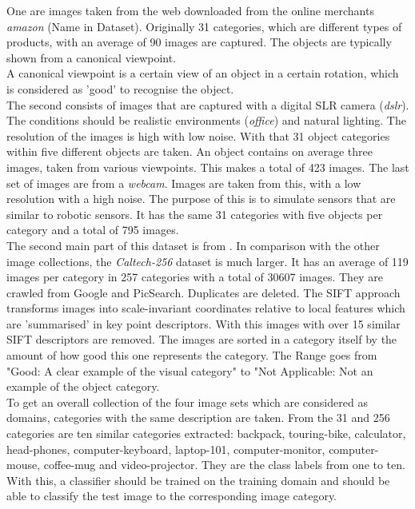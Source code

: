 One are images taken from the web downloaded from the online merchants \textit{amazon} (Name in Dataset).
Originally 31 categories, which are different types of products, with an average of 90 images are captured.
The objects are typically shown from a canonical viewpoint.\\
A canonical viewpoint is a certain view of an object in a certain rotation, which is considered as 'good' to recognise the object. \cite{Edelman.1991}\\
The second consists of images that are captured with a digital SLR camera (\textit{dslr}).
The conditions should be realistic environments (\textit{office}) and natural lighting.
The resolution of the images is high with low noise.
With that 31 object categories within five different objects are taken.
An object contains on average three images, taken from various viewpoints.
This makes a total of 423 images.
The last set of images are from a \textit{webcam}.
Images are taken from this, with a low resolution with a high noise. The purpose of this is to simulate sensors that are similar to robotic sensors.
It has the same 31 categories with five objects per category and a total of 795 images. \\
The second main part of this dataset is from \cite{GregGriffin.}. In comparison with the other image collections, the \textit{Caltech-256} dataset is much larger.
It has an average of 119 images per category in 257 categories with a total of 30607 images.
They are crawled from Google and PicSearch.
Duplicates are deleted. The \ac{SIFT} approach transforms images into scale-invariant coordinates relative to local features which are 'summarised' in key point descriptors.\cite{Lowe.2004}
With this images with over 15 similar \acs{SIFT} descriptors are removed.
The images are sorted in a category itself by the amount of how good this one represents the category.
The Range goes from "Good: A clear example of the visual category" to "Not Applicable: Not an example of the object category.\cite[p.3]{GregGriffin.}\\
To get an overall collection of the four image sets which are considered as domains, categories with the same description are taken.
From the 31 and 256 categories are ten similar categories extracted:
backpack, touring-bike, calculator, head-phones, computer-keyboard, laptop-101, computer-monitor, computer-mouse, coffee-mug and video-projector.
They are the class labels from one to ten. 
With this, a classifier should be trained on the training domain and should be able to classify the test image to the corresponding image category.
